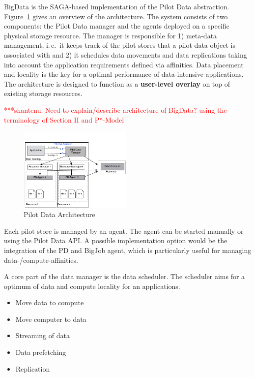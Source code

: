 \documentclass[conference,final]{IEEEtran}
\newcommand{\jhanote}[1]{ {\textcolor{red} { ***shantenu: #1 }}}
\newcommand{\jhanote}[1]{}
\begin{document}
BigData is the SAGA-based implementation of the Pilot Data abstraction.
Figure~\ref{fig:figures_distributed_pilot_job} gives an overview of the
architecture. The system consists of two components: the Pilot Data manager and
the agents deployed on a specific physical storage resource. The manager is
responsible for 1) meta-data management, i.\,e.\ it keeps track of the pilot
stores that a pilot data object is associated with and 2) it schedules data
movements and data replications taking into account the application requirements 
defined via affinities. Data placement and locality is the key for a optimal 
performance of data-intensive applications. The architecture is designed to 
function as a \textbf{user-level overlay} on top of existing storage resources.


\jhanote{Need to explain/describe architecture of BigData? using the
  terminology of Section II and P*-Model}

\begin{figure}[htbp]
    \centering
        \includegraphics[width=0.49\textwidth]{figures/pilot-data-manager.pdf}
    \caption{Pilot Data Architecture}
    \label{fig:figures_distributed_pilot_job}
\end{figure}

Each pilot store is managed by an agent. The agent can be started manually or 
using the Pilot Data API. A possible implementation option would be the 
integration of the PD and BigJob agent, which is particularly useful for 
managing data-/compute-affinities.

A core part of the data manager is the data scheduler. The scheduler aims for a 
optimum of data and compute locality for an applications.
\begin{itemize}
	\item Move data to compute
	\item Move computer to data
	\item Streaming of data
	\item Data prefetching 
	\item Replication
\end{itemize}
\end{document}
